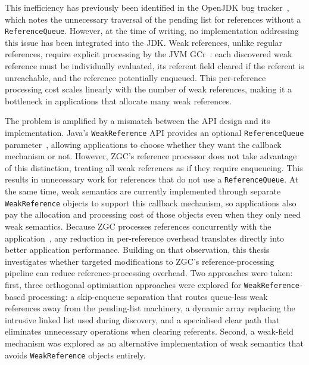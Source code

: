     This inefficiency has previously been identified in the OpenJDK bug tracker~\cite{JDK-8029205}, which notes the unnecessary traversal of the pending list for references without a \texttt{ReferenceQueue}. However, at the time of writing, no implementation addressing this issue has been integrated into the \ac{JDK}. Weak references, unlike regular references, require explicit processing by the \ac{JVM} \ac{GCr}~\cite{openjdk-zreferenceprocessor-cpp,openjdk-referenceprocessor-cpp}: each discovered weak reference must be individually evaluated, its referent field cleared if the referent is unreachable, and the reference potentially enqueued. This per-reference processing cost scales linearly with the number of weak references, making it a bottleneck in applications that allocate many weak references.

    The problem is amplified by a mismatch between the \ac{API} design and its implementation. Java's \texttt{WeakReference} \ac{API} provides an optional \texttt{ReferenceQueue} parameter~\cite{openjdk-weakreference-java}, allowing applications to choose whether they want the callback mechanism or not. However, \ac{ZGC}'s reference processor does not take advantage of this distinction, treating all weak references as if they require enqueueing. This results in unnecessary work for references that do not use a \texttt{ReferenceQueue}. At the same time, weak semantics are currently implemented through separate \texttt{WeakReference} objects to support this callback mechanism, so applications also pay the allocation and processing cost of those objects even when they only need weak semantics. Because \ac{ZGC} processes references concurrently with the application~\cite{jep333-zgc,openjdk-zreferenceprocessor-cpp}, any reduction in per-reference overhead translates directly into better application performance. Building on that observation, this thesis investigates whether targeted modifications to \ac{ZGC}'s reference-processing pipeline can reduce reference-processing overhead. Two approaches were taken: first, three orthogonal optimisation approaches were explored for \texttt{WeakReference}-based processing: a skip-enqueue separation that routes queue-less weak references away from the pending-list machinery, a dynamic array replacing the intrusive linked list used during discovery, and a specialised clear path that eliminates unnecessary operations when clearing referents. Second, a weak-field mechanism was explored as an alternative implementation of weak semantics that avoids \texttt{WeakReference} objects entirely.

